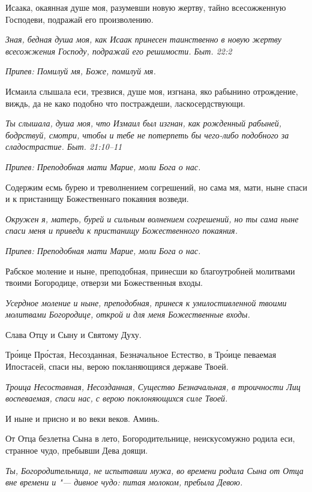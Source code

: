 Исаака, окаянная душе моя, разумевши новую жертву, тайно всесожженную Господеви, подражай его произволению.


\itshape Зная, бедная душа моя, как Исаак принесен таинственно в новую жертву всесожжения Господу, подражай его решимости. Быт. 22:2\normalfont{}


\itshape Припев:\normalfont{} Помилуй мя, Боже, помилуй мя.


Исмаила слышала еси, трезвися, душе моя, изгнана, яко рабынино отрождение, виждь, да не како подобно что постраждеши, ласкосердствующи.


\itshape Ты слышала, душа моя, что Измаил был изгнан, как рожденный рабыней, бодрствуй, смотри, чтобы и тебе не потерпеть бы чего-либо подобного за сладострастие. Быт. 21:10–11\normalfont{}


\itshape Припев:\normalfont{} Преподобная мати Марие, моли Бога о нас.


Содержим есмь бурею и треволнением согрешений, но сама мя, мати, ныне спаси и к пристанищу Божественнаго покаяния возведи.


\itshape Окружен я, матерь, бурей и сильным волнением согрешений, но ты сама ныне спаси меня и приведи к пристанищу Божественного покаяния.\normalfont{}


\itshape Припев:\normalfont{} Преподобная мати Марие, моли Бога о нас.


Рабское моление и ныне, преподобная, принесши ко благоутробней молитвами твоими Богородице, отверзи ми Божественныя входы.


\itshape Усердное моление и ныне, преподобная, принеся к умилостивленной твоими молитвами Богородице, открой и для меня Божественные входы.\normalfont{}


Слава Отцу и Сыну и Святому Духу.


Тро́ице Про́стая, Несозданная, Безначальное Естество, в Тро́ице певаемая Ипостасей, спаси ны, верою покланяющияся державе Твоей.


\itshape Троица Несоставная, Несозданная, Существо Безначальная, в троичности Лиц воспеваемая, спаси нас, с верою поклоняющихся силе Твоей.\normalfont{}


И ныне и присно и во веки веков. Аминь.


От Отца безлетна Сына в лето, Богородительнице, неискусомужно родила еси, странное чудо, пребывши Дева доящи.


\itshape Ты, Богородительница, не испытавши мужа, во времени родила Сына от Отца вне времени и "--- дивное чудо: питая молоком, пребыла Девою.\normalfont{}





